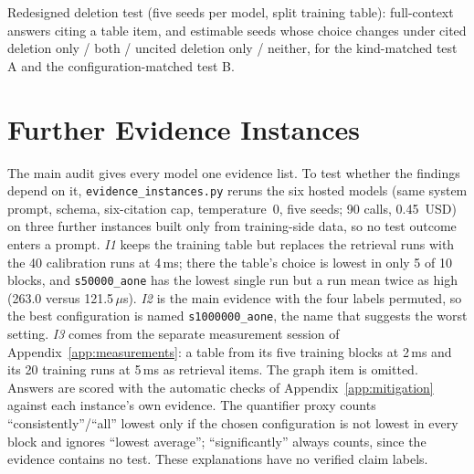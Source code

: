 \begin{table}[h]
\centering\footnotesize\setlength{\tabcolsep}{3pt}
\caption{Redesigned deletion test (five seeds per model, split training table): full-context answers citing a table item, and estimable seeds whose choice changes under cited deletion only / both / uncited deletion only / neither, for the kind-matched test A and the configuration-matched test B.}
\label{tab:reliance}
\begin{adjustbox}{max width=\columnwidth}

\end{adjustbox}
\end{table}

\section{Further Evidence Instances}
\label{app:instances}
The main audit gives every model one evidence list. To test whether the findings depend on it, \texttt{evidence\_instances.py} reruns the six hosted models (same system prompt, schema, six-citation cap, temperature~0, five seeds; 90 calls, 0.45~USD) on three further instances built only from training-side data, so no test outcome enters a prompt. \emph{I1} keeps the training table but replaces the retrieval runs with the 40 calibration runs at 4\,ms; there the table's choice is lowest in only 5 of 10 blocks, and \texttt{s50000\_aone} has the lowest single run but a run mean twice as high (263.0 versus 121.5\,$\mu$s). \emph{I2} is the main evidence with the four labels permuted, so the best configuration is named \texttt{s1000000\_aone}, the name that suggests the worst setting. \emph{I3} comes from the separate measurement session of Appendix~\ref{app:measurements}: a table from its five training blocks at 2\,ms and its 20 training runs at 5\,ms as retrieval items. The graph item is omitted. Answers are scored with the automatic checks of Appendix~\ref{app:mitigation} against each instance's own evidence. The quantifier proxy counts ``consistently''/``all'' lowest only if the chosen configuration is not lowest in every block and ignores ``lowest average''; ``significantly'' always counts, since the evidence contains no test. These explanations have no verified claim labels.

